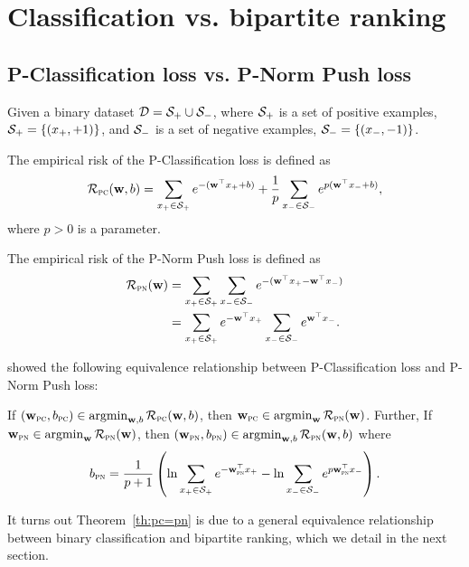 \section{Classification vs. bipartite ranking}
\label{sec:binary}


\subsection{P-Classification loss vs. P-Norm Push loss}
\label{ssec:pc=pn}

Given a binary dataset $\mathcal{D} = \mathcal{S}_+ \cup \mathcal{S}_-$, where $\mathcal{S}_+$ is a set of positive examples, 
\ie $\mathcal{S}_+ = \{(x_+, +1)\}$, and $\mathcal{S}_-$ is a set of negative examples, \ie $\mathcal{S}_- = \{(x_-, -1)\}$.

The empirical risk of the P-Classification loss is defined as~\cite{ertekin2011equivalence}
\begin{equation*}
\mathcal{R}_\textsc{pc}(\mathbf{w}, b) 
= \sum_{x_+ \in \mathcal{S}_+} e^{- (\mathbf{w}^\top x_+ + b)} +
  \frac{1}{p} \sum_{x_- \in \mathcal{S}_-} e^{p (\mathbf{w}^\top x_- + b)},
\end{equation*}
where $p > 0$ is a parameter.

The empirical risk of the P-Norm Push loss is defined as~\cite{rudin2009p}
\begin{equation*}
\begin{aligned}
\mathcal{R}_\textsc{pn}(\mathbf{w})
&= \sum_{x_+ \in \mathcal{S}_+} \sum_{x_- \in \mathcal{S}_-} e^{-(\mathbf{w}^\top x_+ - \mathbf{w}^\top x_-)} \\
&= \sum_{x_+ \in \mathcal{S}_+} e^{-\mathbf{w}^\top x_+} \sum_{x_- \in \mathcal{S}_-} e^{\mathbf{w}^\top x_-}.
\end{aligned}
\end{equation*}

\citep{ertekin2011equivalence} showed the following equivalence relationship between P-Classification loss and P-Norm Push loss:
\begin{theorem}
\label{th:pc=pn}
If $(\mathbf{w}_\textsc{pc}, b_\textsc{pc}) \in \operatorname*{argmin}_{\mathbf{w},b} \mathcal{R}_\textsc{pc}(\mathbf{w}, b)$, 
then $\mathbf{w}_\textsc{pc} \in \operatorname*{argmin}_{\mathbf{w}} \mathcal{R}_\textsc{pn}(\mathbf{w})$.
Further, If $\mathbf{w}_\textsc{pn} \in \operatorname*{argmin}_{\mathbf{w}} \mathcal{R}_\textsc{pn}(\mathbf{w})$, 
then $(\mathbf{w}_\textsc{pn}, b_\textsc{pn}) \in \operatorname*{argmin}_{\mathbf{w},b} \mathcal{R}_\textsc{pn}(\mathbf{w}, b)$ where
$$
b_\textsc{pn} 
= \frac{1}{p + 1} \left( 
  \ln \sum_{x_+ \in \mathcal{S}_+} e^{-\mathbf{w}_\textsc{pn}^\top x_+} - 
  \ln \sum_{x_- \in \mathcal{S}_-} e^{p\mathbf{w}_\textsc{pn}^\top x_-} \right).
$$
\end{theorem}

It turns out Theorem~\ref{th:pc=pn} is due to a general equivalence relationship 
between binary classification and bipartite ranking, which we detail in the next section.



